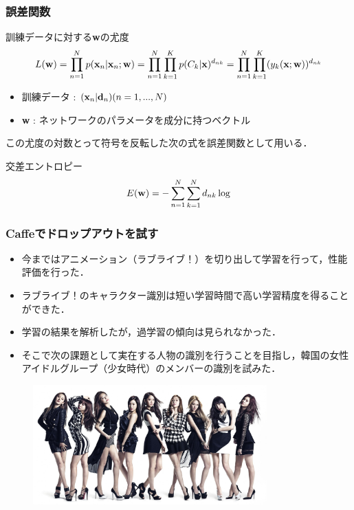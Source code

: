 \documentclass[dvipdfmx,11pt,notheorems]{beamer}
\theoremstyle{definition}
\begin{document}
\begin{frame}[fragile]\frametitle{誤差関数}

 \begin{exampleblock}{訓練データに対する{\bf w}の尤度}
  \begin{equation}
    L({\bf w})=\prod_{n=1}^{N}p({\bf x}_n|{\bf x}_n;{\bf
	w})=\prod_{n=1}^{N}\prod_{k=1}^{K}p(C_k|{\bf
	x})^{d_{nk}}=\prod_{n=1}^{N}\prod_{k=1}^{K}(y_k({\bf x};{\bf w}))^{d_{nk}}
  \end{equation}
 \end{exampleblock}

 \begin{itemize}
	\item 訓練データ : ${({\bf x}_n|{\bf d}_n)}(n=1,...,N)$
	\item {\bf w} : ネットワークのパラメータを成分に持つベクトル
 \end{itemize}

この尤度の対数とって符号を反転した次の式を誤差関数として用いる．

 \begin{exampleblock}{交差エントロピー}
  \begin{equation}
   E({\bf w})=-\sum^{N}_{n=1}\sum^{N}_{k=1}d_{nk}\log
  \end{equation}
 \end{exampleblock}

\end{frame}

\begin{frame}\frametitle{Caffeでドロップアウトを試す}
\begin{itemize}
  \item 今まではアニメーション（ラブライブ！）を切り出して学習を行って，性能評価を行った．
  \item ラブライブ！のキャラクター識別は短い学習時間で高い学習精度を得ることができた．
  \item 学習の結果を解析したが，過学習の傾向は見られなかった．
  \item そこで次の課題として実在する人物の識別を行うことを目指し，韓国の女性アイドルグループ（少女時代）のメンバーの識別を試みた．
\end{itemize}
\begin{figure}[htbp]
  \begin{center}
    \includegraphics[clip,width=9cm,bb=0 0 1654 849]{./fig/jpg/snsd.jpg}
  \end{center}
\end{figure}

\end{frame}
\end{document}
